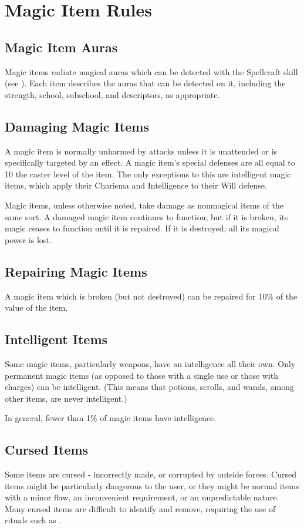 
\section{Magic Item Rules}

\subsection{Magic Item Auras}

Magic items radiate magical auras which can be detected with the Spellcraft skill (see ). Each item describes the auras that can be detected on it, including the strength, school, subschool, and descriptors, as appropriate.

\subsection{Damaging Magic Items}

A magic item is normally unharmed by attacks unless it is unattended or is specifically targeted by an effect. A magic item's special defenses are all equal to 10 \add the caster level of the item. The only exceptions to this are intelligent magic items, which apply their Charisma and Intelligence to their Will defense.

Magic items, unless otherwise noted, take damage as nonmagical items of the same sort. A damaged magic item continues to function, but if it is broken, its magic ceases to function until it is repaired. If it is destroyed, all its magical power is lost.

\subsection{Repairing Magic Items}

A magic item which is broken (but not destroyed) can be repaired for 10\% of the value of the item. 

\subsection{Intelligent Items}

Some magic items, particularly weapons, have an intelligence all their own. Only permanent magic items (as opposed to those with a single use or those with charges) can be intelligent. (This means that potions, scrolls, and wands, among other items, are never intelligent.)

In general, fewer than 1\% of magic items have intelligence.

\subsection{Cursed Items}

Some items are cursed - incorrectly made, or corrupted by outside forces. Cursed items might be particularly dangerous to the user, or they might be normal items with a minor flaw, an inconvenient requirement, or an unpredictable nature. Many cursed items are difficult to identify and remove, requiring the use of rituals such as .
